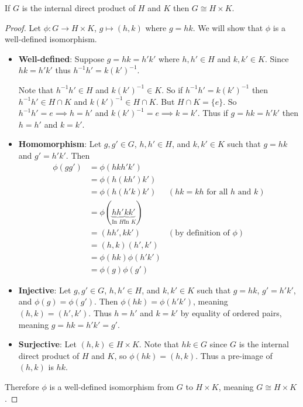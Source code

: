 \begin{theorem}\label{thrm-direct-product-equivilance}
    If $G$ is the internal direct product of $H$ and $K$ then $G \cong H \times K$.
\end{theorem}
\begin{proof}
    Let $\phi: G \to H \times K$, $g \mapsto (h, k)$ where $g = hk$. We will show that $\phi$ is a well-defined isomorphism.
    \begin{itemize}
        \item \textbf{Well-defined}: Suppose $g = hk = h'k'$ where $h, h' \in H$ and $k, k' \in K$. Since $hk = h'k'$ thus $h^{-1}h' = k(k')^{-1}$.

        Note that $h^{-1}h' \in H$ and $k(k')^{-1} \in K$. So if $h^{-1}h' = k(k')^{-1}$ then $h^{-1}h' \in H \cap K$ and $k(k')^{-1} \in H \cap K$. But $H \cap K = \{e\}$. So $h^{-1}h' = e \implies h = h'$ and $k(k')^{-1} = e \implies k = k'$. Thus if $g = hk = h'k'$ then $h = h'$ and $k = k'$.
        
        \newpage
        
        \item \textbf{Homomorphism}: Let $g, g' \in G$, $h, h' \in H$, and $k, k' \in K$ such that $g = hk$ and $g' = h'k'$. Then
        \begin{align*}
            \phi(gg') &= \phi(hkh'k')\\
            &= \phi(h(kh')k')\\
            &= \phi(h(h'k)k') & (hk = kh \text{ for all } h \text{ and } k)\\
            &= \phi(\underbrace{hh'}_{\text{In }H}\underbrace{kk'}_{\text{In }K})\\
            &= (hh', kk') & (\text{by definition of }\phi)\\
            &= (h,k)(h',k')\\
            &= \phi(hk)\phi(h'k')\\
            &= \phi(g)\phi(g')
        \end{align*}
        
        \item \textbf{Injective}: Let $g, g' \in G$, $h, h' \in H$, and $k, k' \in K$ such that $g = hk$, $g' = h'k'$, and $\phi(g) = \phi(g')$. Then $\phi(hk) = \phi(h'k')$, meaning $(h,k) = (h',k')$. Thus $h = h'$ and $k = k'$ by equality of ordered pairs, meaning $g = hk = h'k' = g'$.
        
        \item \textbf{Surjective}: Let $(h, k) \in H \times K$. Note that $hk \in G$ since $G$ is the internal direct product of $H$ and $K$, so $\phi(hk) = (h, k)$. Thus a pre-image of $(h, k)$ is $hk$.
    \end{itemize}
    Therefore $\phi$ is a well-defined isomorphism from $G$ to $H \times K$, meaning $G \cong H \times K$.
\end{proof}

